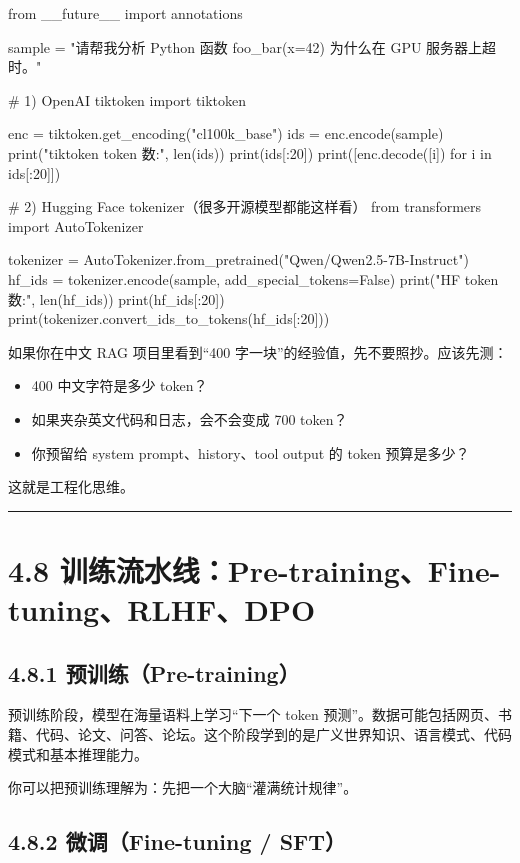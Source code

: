 \begin{codeblock}
from __future__ import annotations

sample = "请帮我分析 Python 函数 foo_bar(x=42) 为什么在 GPU 服务器上超时。"

# 1) OpenAI tiktoken
import tiktoken

enc = tiktoken.get_encoding("cl100k_base")
ids = enc.encode(sample)
print("tiktoken token 数:", len(ids))
print(ids[:20])
print([enc.decode([i]) for i in ids[:20]])

# 2) Hugging Face tokenizer（很多开源模型都能这样看）
from transformers import AutoTokenizer

tokenizer = AutoTokenizer.from_pretrained("Qwen/Qwen2.5-7B-Instruct")
hf_ids = tokenizer.encode(sample, add_special_tokens=False)
print("HF token 数:", len(hf_ids))
print(hf_ids[:20])
print(tokenizer.convert_ids_to_tokens(hf_ids[:20]))
\end{codeblock}

如果你在中文 RAG 项目里看到``400 字一块''的经验值，先不要照抄。应该先测：


\begin{itemize}[leftmargin=2em]
\item 400 中文字符是多少 token？
\item 如果夹杂英文代码和日志，会不会变成 700 token？
\item 你预留给 system prompt、history、tool output 的 token 预算是多少？
\end{itemize}

这就是工程化思维。


\bigskip\hrule\bigskip

\section{4.8 训练流水线：Pre-training、Fine-tuning、RLHF、DPO}

\subsection{4.8.1 预训练（Pre-training）}

预训练阶段，模型在海量语料上学习``下一个 token 预测''。数据可能包括网页、书籍、代码、论文、问答、论坛。这个阶段学到的是广义世界知识、语言模式、代码模式和基本推理能力。


你可以把预训练理解为：先把一个大脑``灌满统计规律''。


\subsection{4.8.2 微调（Fine-tuning / SFT）}

